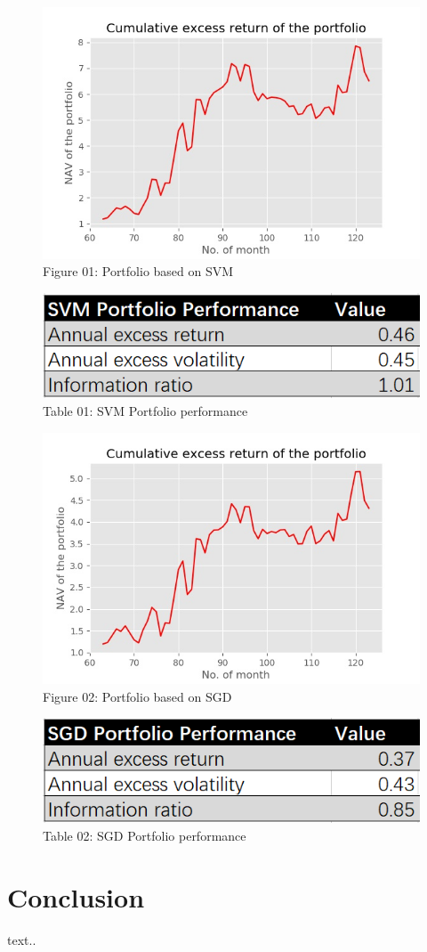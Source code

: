 \documentclass[12pt]{article}
\begin{document}
\begin{figure}[h]
	\centering
	\includegraphics[width=0.6\linewidth]{pic//NAV_SVM.jpg}
	\caption*{Figure 01: Portfolio based on SVM}
	\label{fig:label}
\end{figure}

\begin{figure}[h]
	\centering
	\includegraphics[width=0.6\linewidth]{pic//SVM_Performance.png}
	\caption*{Table 01: SVM Portfolio performance}
	\label{fig:label}
\end{figure}
\newpage
\begin{figure}[h]
\centering
\includegraphics[width=0.6\linewidth]{pic//NAV_SGD.jpg}
\caption*{Figure 02: Portfolio based on SGD}
\label{fig:label}
\end{figure}

\begin{figure}[h]
	\centering
	\includegraphics[width=0.6\linewidth]{pic//SGD_Performance.png}
	\caption*{Table 02: SGD Portfolio performance}
	\label{fig:label}
\end{figure}



\section{Conclusion} %

text..
\end{document}
